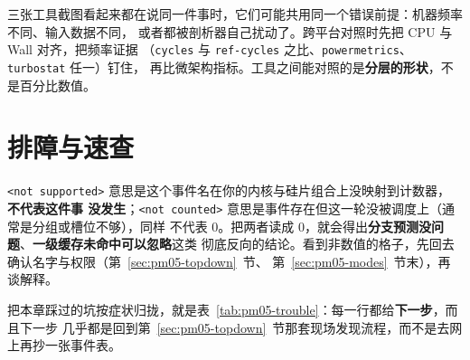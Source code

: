 \documentclass[12pt,a4paper,fontset=fandol]{ctexbook}
\newcommand{\Tp}[1]{\texttt{#1}}
\newcommand{\Lang}[1]{\textsf{#1}}
\newcommand{\MWall}{\Lang{Wall}}
\newcommand{\MCpu}{\Lang{CPU}}
\begin{document}
\begin{warning}[title={三个平台共同的假象}]
三张工具截图看起来都在说同一件事时，它们可能共用同一个错误前提：机器频率不同、输入数据不同，
或者都被剖析器自己扰动了。跨平台对照时先把 \MCpu{} 与 \MWall{} 对齐，把频率证据
（\Tp{cycles} 与 \Tp{ref-cycles} 之比、\Tp{powermetrics}、\Tp{turbostat} 任一）钉住，
再比微架构指标。工具之间能对照的是\textbf{分层的形状}，不是百分比数值。
\end{warning}

\section{排障与速查}
\label{sec:pm05-trouble}

\begin{warning}[title={\Tp{not supported} 被当成\,\textbf{零开销}}]
\Tp{<not supported>} 意思是这个事件名在你的内核与硅片组合上没映射到计数器，\textbf{不代表这件事
没发生}；\Tp{<not counted>} 意思是事件存在但这一轮没被调度上（通常是分组或槽位不够），同样
不代表 0。把两者读成 0，就会得出\textbf{分支预测没问题}、\textbf{一级缓存未命中可以忽略}这类
彻底反向的结论。看到非数值的格子，先回去确认名字与权限（第~\ref{sec:pm05-topdown}~节、
第~\ref{sec:pm05-modes}~节末），再谈解释。
\end{warning}

把本章踩过的坑按症状归拢，就是表~\ref{tab:pm05-trouble}：每一行都给\textbf{下一步}，而且下一步
几乎都是回到第~\ref{sec:pm05-topdown}~节那套现场发现流程，而不是去网上再抄一张事件表。
\end{document}
